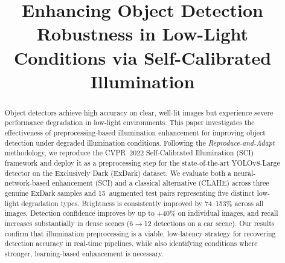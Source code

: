 \documentclass[conference]{IEEEtran}
\begin{document}
\title{Enhancing Object Detection Robustness in Low-Light Conditions via
Self-Calibrated Illumination}

\author{
  \and
  \and
}

\maketitle

\begin{abstract}
Object detectors achieve high accuracy on clear, well-lit images but
experience severe performance degradation in low-light environments.
This paper investigates the effectiveness of preprocessing-based
illumination enhancement for improving object detection under degraded
illumination conditions. Following the \emph{Reproduce-and-Adapt}
methodology, we reproduce the CVPR~2022 Self-Calibrated Illumination
(SCI) framework and deploy it as a preprocessing step for the
state-of-the-art YOLOv8-Large detector on the Exclusively Dark (ExDark)
dataset. We evaluate both a neural-network-based enhancement (SCI) and a
classical alternative (CLAHE) across three genuine ExDark samples and
15~augmented test pairs representing five distinct low-light degradation
types. Brightness is consistently improved by 74--153\% across all
images. Detection confidence improves by up to $+40\%$ on individual
images, and recall increases substantially in dense scenes (6$\to$12
detections on a car scene). Our results confirm that illumination
preprocessing is a viable, low-latency strategy for recovering detection
accuracy in real-time pipelines, while also identifying conditions where
stronger, learning-based enhancement is necessary.
\end{abstract}
\end{document}
